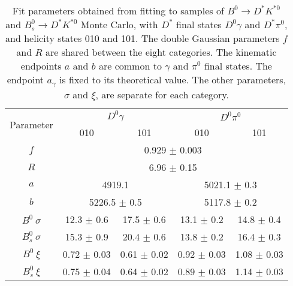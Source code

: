 \begin{table}[h]
    \centering
    \begin{tabular}{ccccc}
        \toprule
        \multirow{2}{*}{Parameter} & \multicolumn{2}{c}{$D^0 \gamma$} & \multicolumn{2}{c}{$D^0 \pi^0$} \\
                                   & 010 & 101 & 010 & 101 \\
        \midrule
      $f$ & \multicolumn{4}{c}{0.929 $\pm$ 0.003} \\
      $R$ & \multicolumn{4}{c}{6.96 $\pm$ 0.15} \\
      \midrule
      $a$ & \multicolumn{2}{c}{4919.1} & \multicolumn{2}{c}{5021.1 $\pm$ 0.3} \\
      $b$ & \multicolumn{2}{c}{5226.5 $\pm$ 0.5} & \multicolumn{2}{c}{5117.8 $\pm$ 0.2} \\
      \midrule
      $B^0\ \sigma$ & 12.3 $\pm$ 0.6 & 17.5 $\pm$ 0.6 & 13.1 $\pm$ 0.2 & 14.8 $\pm$ 0.4 \\
      $B^0_s\ \sigma$ & 15.3 $\pm$ 0.9 & 20.4 $\pm$ 0.6 & 13.8 $\pm$ 0.2 & 16.4 $\pm$ 0.3 \\
      $B^0\ \xi$ & 0.72 $\pm$ 0.03 & 0.61 $\pm$ 0.02 & 0.92 $\pm$ 0.03 & 1.08 $\pm$ 0.03 \\
      $B^0_s\ \xi$ & 0.75 $\pm$ 0.04 & 0.64 $\pm$ 0.02 & 0.89 $\pm$ 0.03 & 1.14 $\pm$ 0.03 \\
        \bottomrule
    \end{tabular}
    \caption{Fit parameters obtained from fitting to samples of $B^0\to
D^*K^{*0}$ and $B^0_s \to D^*K^{*0}$ Monte Carlo, with $D^*$ final states $D^0\gamma$
and $D^*\pi^0$, and helicity states 010 and 101. The double Gaussian parameters $f$
and $R$ are shared between the eight categories. The kinematic endpoints $a$ and $b$
are common to $\gamma$ and $\pi^0$ final states. The endpoint $a_{\gamma}$ is fixed
to its theoretical value. The other parameters, $\sigma$ and $\xi$, are separate for each category.}
\label{tab:lowMass_mc_params}
\end{table}

